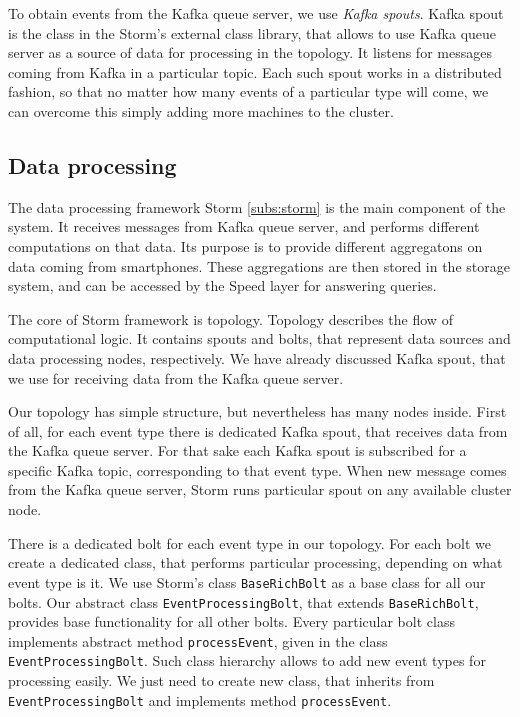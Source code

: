 To obtain events from the Kafka queue server, we use \textit{Kafka spouts}.
Kafka spout is the class in the Storm's external class library, that allows to use Kafka queue server as a source of data for processing in the topology.
It listens for messages coming from Kafka in a particular topic.
Each such spout works in a distributed fashion, so that no matter how many events of a particular type will come, we can overcome this simply adding more machines to the cluster.

\subsection{Data processing}

The data processing framework Storm \ref{subs:storm} is the main component of the system.
It receives messages from Kafka queue server, and performs different computations on that data.
Its purpose is to provide different aggregatons on data coming from smartphones.
These aggregations are then stored in the storage system, and can be accessed by the Speed layer for answering queries.

The core of Storm framework is topology.
Topology describes the flow of computational logic.
It contains spouts and bolts, that represent data sources and data processing nodes, respectively.
We have already discussed Kafka spout, that we use for receiving data from the Kafka queue server.

Our topology has simple structure, but nevertheless has many nodes inside.
First of all, for each event type there is dedicated Kafka spout, that receives data from the Kafka queue server.
For that sake each Kafka spout is subscribed for a specific Kafka topic, corresponding to that event type.
When new message comes from the Kafka queue server, Storm runs particular spout on any available cluster node.

There is a dedicated bolt for each event type in our topology.
For each bolt we create a dedicated class, that performs particular processing, depending on what event type is it.
We use Storm's class \lstinline{BaseRichBolt} as a base class for all our bolts.
Our abstract class \lstinline{EventProcessingBolt}, that extends \lstinline{BaseRichBolt}, provides base functionality for all other bolts.
Every particular bolt class implements abstract method \lstinline{processEvent}, given in the class \lstinline{EventProcessingBolt}.
Such class hierarchy allows to add new event types for processing easily.
We just need to create new class, that inherits from \lstinline{EventProcessingBolt} and implements method \lstinline{processEvent}.

